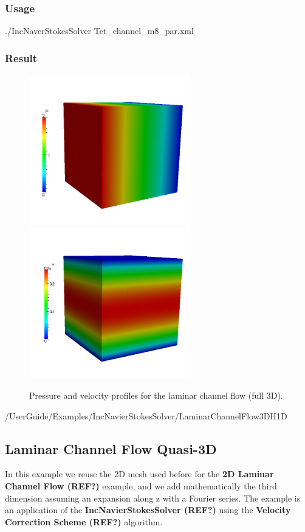 \subsubsection{Usage}
./IncNaverStokesSolver Tet\_channel\_m8\_par.xml

\subsubsection{Result}
\begin{figure}
\begin{center}
\includegraphics[width=7cm]{Figures/CF3DP8PR.png}
\includegraphics[width=7cm]{Figures/CF3DP8.png}
\caption{Pressure and velocity profiles for the laminar channel flow (full 3D).}
\end{center}
\end{figure}






/UserGuide/Examples/IncNavierStokesSolver/LaminarChannelFlow3DH1D
\subsection{Laminar Channel Flow Quasi-3D}
In this example we reuse the 2D mesh used before for the \textbf{2D Laminar Channel Flow (REF?)} example, and we add mathematically the third dimension assuming an expansion along z with a Fourier series. The example is an application of the \textbf{IncNavierStokesSolver  (REF?)} using the \textbf{Velocity Correction Scheme (REF?)} algorithm.

